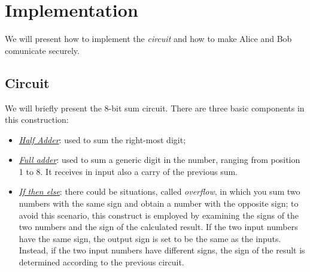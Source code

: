 \documentclass[12pt]{article}
\begin{document}
\section{Implementation}
We will present how to implement the \textit{circuit} and how to make Alice and Bob comunicate securely.
\subsection{Circuit}
We will briefly present the 8-bit sum circuit. There are three basic components in this construction:
\begin{itemize}
    \item \textit{\hyperref[half]{Half Adder}}: used to sum the right-most digit;
    \item \textit{\hyperref[full]{Full adder}}:  used to sum a generic digit in the number, ranging from position 1 to 8. It receives in input also a carry of the previous sum.
    \item \textit{\hyperref[overflow]{If then else}}: there could be situations, called \textit{overflow}, in which you sum two numbers with the same sign and obtain a number with the opposite sign; to avoid this scenario, this construct is employed by examining the signs of the two numbers and the sign of the calculated result. If the two input numbers have the same sign, the output sign is set to be the same as the inputs. Instead, if the two input numbers have different signs, the sign of the result is determined according to the previous circuit.  
\end{itemize}
\end{document}
